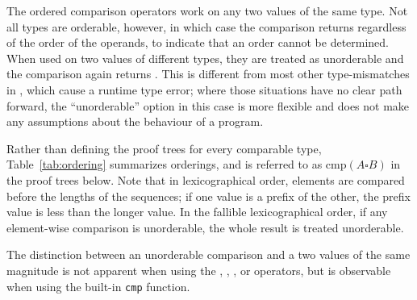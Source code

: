 \begin{prooftree}
\end{prooftree}

\begin{prooftree}
\end{prooftree}

\FloatBarrier
The ordered comparison operators work on any two values of the same type. Not all types are
orderable, however, in which case the comparison returns  regardless of the order
of the operands, to indicate that an order cannot be determined. When used on two values of
different types, they are treated as unorderable and the comparison again returns .
This is different from most other type-mismatches in \Trilogy{}, which cause a runtime type
error; where those situations have no clear path forward, the ``unorderable'' option in this
case is more flexible and does not make any assumptions about the behaviour of a program.

Rather than defining the proof trees for every comparable type, Table~\ref{tab:ordering} summarizes
orderings, and is referred to as $\text{cmp}(A \square B)$ in the proof trees below. Note
that in lexicographical order, elements are compared before the lengths of the sequences;
if one value is a prefix of the other, the prefix value is less than the longer value.
In the fallible lexicographical order, if any element-wise comparison is unorderable, the
whole result is treated unorderable.

The distinction between an unorderable comparison and a two values of the same magnitude is
not apparent when using the \op{<}, \op{>}, \op{<=}, or \op{>=} operators, but is observable
when using the built-in \texttt{cmp} function.

